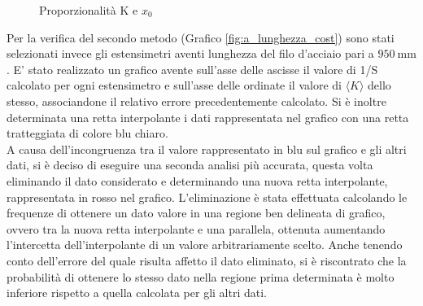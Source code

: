 \documentclass[a4paper,11pt,oneside]{article}
\begin{document}
\begin{figure}[h!]
    \centering
    \caption{Proporzionalità K e $x_{0}$}
\end{figure}


Per la verifica del secondo metodo (Grafico \ref{fig:a_lunghezza_cost}) sono stati selezionati invece gli estensimetri aventi lunghezza del filo d'acciaio pari a $\SI{950}{\milli\meter}$. E' stato realizzato un grafico avente sull'asse delle ascisse il valore di 1/S  calcolato per ogni estensimetro e sull'asse delle ordinate il valore di $\langle K \rangle$ dello stesso, associandone il relativo errore precedentemente calcolato. Si è inoltre determinata una retta interpolante i dati rappresentata nel grafico con una retta tratteggiata di colore blu chiaro.\\
A causa dell'incongruenza tra il valore rappresentato in blu sul grafico e gli altri dati, si è deciso di eseguire una seconda analisi più accurata, questa volta eliminando il dato considerato e determinando una nuova retta interpolante, rappresentata in rosso nel grafico. L'eliminazione è stata effettuata calcolando le frequenze di ottenere un dato valore in una regione ben delineata di grafico, ovvero tra la nuova retta interpolante e una parallela, ottenuta aumentando l'intercetta dell'interpolante di un valore arbitrariamente scelto. Anche tenendo conto dell'errore del quale risulta affetto il dato eliminato, si è riscontrato che la probabilità di ottenere lo stesso dato nella regione prima determinata è molto inferiore rispetto a quella calcolata per gli altri dati.
\end{document}
